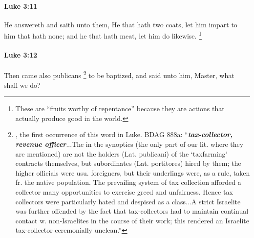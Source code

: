 		\paragraph{Luke 3:11} %
			\label{LUKE-3-11}

			He answereth and saith unto them, He that hath two coats, let him impart to him that hath none; and he that hath meat, let him do likewise.%
				\footnote{%
					These are ``fruits worthy of repentance'' because they are actions that actually produce good in the world.
					}

			\begin{framed}
			\scriptsize
				\begin{compactdesc}
					\item[SBLG] 
				\end{compactdesc}
			\end{framed}

		\paragraph{Luke 3:12} %
			\label{LUKE-3-12}

			Then came also publicans%
				\footnote{%
					, the first occurrence of this word in Luke. BDAG 888a: ``\textbf{\textit{tax-collector, revenue officer}}...The  in the synoptics (the only part of our lit. where they are mentioned) are not the holders (Lat. publicani) of the `taxfarming' contracts themselves, but subordinates (Lat. portitores) hired by them; the higher officials were usu. foreigners, but their underlings were, as a rule, taken fr. the native population. The prevailing system of tax collection afforded a collector many opportunities to exercise greed and unfairness. Hence tax collectors were particularly hated and despised as a class...A strict Israelite was further offended by the fact that tax-collectors had to maintain continual contact w. non-Israelites in the course of their work; this rendered an Israelite tax-collector ceremonially unclean.''
					}
			to be baptized, and said unto him, Master, what shall we do?

